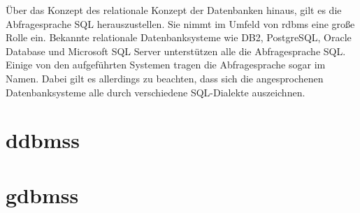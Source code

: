 Über das Konzept des relationale Konzept der Datenbanken hinaus, gilt es die Abfragesprache SQL herauszustellen. Sie nimmt im Umfeld von \acs{rdbms} eine große Rolle ein. Bekannte relationale Datenbanksysteme wie DB2, PostgreSQL, Oracle Database und Microsoft SQL Server unterstützen alle die Abfragesprache SQL. Einige von den aufgeführten Systemen tragen die Abfragesprache sogar im Namen. Dabei gilt es allerdings zu beachten, dass sich die angesprochenen Datenbanksysteme alle durch verschiedene SQL-Dialekte auszeichnen.



\section{\acl{ddbms}s}

\section{\acl{gdbms}s}

